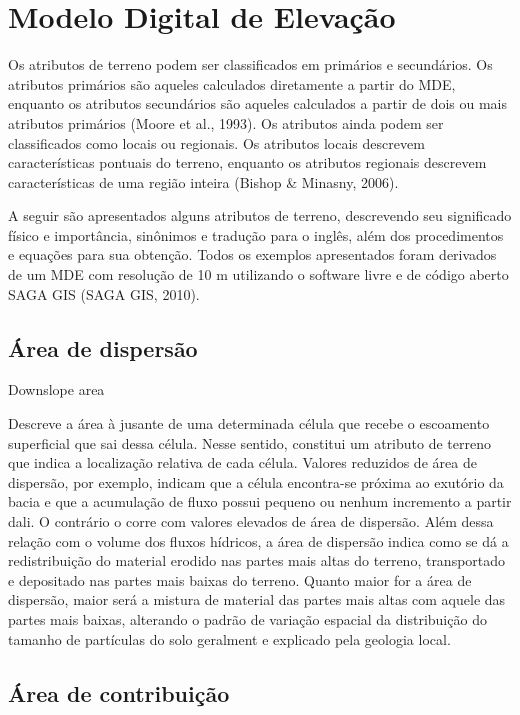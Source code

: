 \documentclass[]{book}
\begin{document}
\chapter{Modelo Digital de Elevação}\label{modelo-digital-de-elevacao}

Os atributos de terreno podem ser classificados em primários e
secundários. Os atributos primários são aqueles calculados diretamente a
partir do MDE, enquanto os atributos secundários são aqueles calculados
a partir de dois ou mais atributos primários (Moore et al., 1993). Os
atributos ainda podem ser classificados como locais ou regionais. Os
atributos locais descrevem características pontuais do terreno, enquanto
os atributos regionais descrevem características de uma região inteira
(Bishop \& Minasny, 2006).

A seguir são apresentados alguns atributos de terreno, descrevendo seu
significado físico e importância, sinônimos e tradução para o inglês,
além dos procedimentos e equações para sua obtenção. Todos os exemplos
apresentados foram derivados de um MDE com resolução de 10 m utilizando
o software livre e de código aberto SAGA GIS (SAGA GIS, 2010).

\section{Área de dispersão}\label{area-de-dispersao}

Downslope area

Descreve a área à jusante de uma determinada célula que recebe o
escoamento superficial que sai dessa célula. Nesse sentido, constitui um
atributo de terreno que indica a localização relativa de cada célula.
Valores reduzidos de área de dispersão, por exemplo, indicam que a
célula encontra-se próxima ao exutório da bacia e que a acumulação de
fluxo possui pequeno ou nenhum incremento a partir dali. O contrário o
corre com valores elevados de área de dispersão. Além dessa relação com
o volume dos fluxos hídricos, a área de dispersão indica como se dá a
redistribuição do material erodido nas partes mais altas do terreno,
transportado e depositado nas partes mais baixas do terreno. Quanto
maior for a área de dispersão, maior será a mistura de material das
partes mais altas com aquele das partes mais baixas, alterando o padrão
de variação espacial da distribuição do tamanho de partículas do solo
geralment e explicado pela geologia local.

\section{Área de contribuição}\label{area-de-contribuicao}
\end{document}
